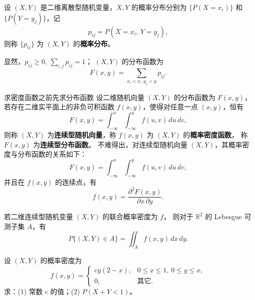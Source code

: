 \begin{definition}
设 $(X,Y)$ 是二维离散型随机变量，$X,Y$ 的概率分布分别为  
$\{P(X = x_i)\}$ 和 $\{P(Y = y_j)\}$，记  
\[
p_{ij} = P(X = x_i,\, Y = y_j),
\]
则称 $\{p_{ij}\}$ 为 $(X,Y)$ 的\textbf{概率分布}。

显然，$p_{ij} \ge 0,\ \sum_{i,j} p_{ij} = 1$；  
$(X,Y)$ 的分布函数为
\[
F(x,y) = \sum_{x_i < x,\, y_j < y} p_{ij}. \tag{2.2.4}
\]
\end{definition}
求密度函数之前先求分布函数
设二维随机向量 $(X,Y)$ 的分布函数为 $F(x,y)$，  
若存在二维实平面上的非负可积函数 $f(x,y)$，使得对任意一点 $(x,y)$，恒有
\[
F(x,y) = \int_{-\infty}^{x} \int_{-\infty}^{y} f(u,v)\,du\,dv,
\]
则称 $(X,Y)$ 为\textbf{连续型随机向量}，称 $f(x,y)$ 为 $(X,Y)$ 的\textbf{概率密度函数}，
称 $F(x,y)$ 为\textbf{连续型分布函数}。
不难得出，对连续型随机向量 $(X,Y)$，其概率密度与分布函数的关系如下：
\[
F(x,y) = \int_{-\infty}^{x} \int_{-\infty}^{y} f(u,v)\,du\,dv,
\]
并且在 $f(x,y)$ 的连续点，有
\[
f(x,y) = \frac{\partial^2 F(x,y)}{\partial x\,\partial y}.
\]
\begin{theorem}
若二维连续型随机变量 $(X,Y)$ 的联合概率密度为 $f$，  
则对于 $\mathbb{R}^2$ 的 Lebesgue 可测子集 $A$，有
\[
P\{(X,Y)\in A\} = \iint_{A} f(x,y)\,dx\,dy.
\]
\end{theorem}
\begin{example}
    

设 $(X,Y)$ 的概率密度为
\[
f(x,y)=
\begin{cases}
cy(2-x), & 0\le x\le 1,\ 0\le y\le x,\\[4pt]
0, & \text{其它.}
\end{cases}
\]
求：(1) 常数 $c$ 的值；(2) $P(X+Y<1)$。
\end{example}


